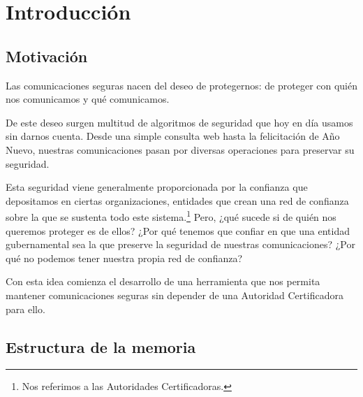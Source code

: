 
\chapter{Introducción} %

\label{Chapter1}


\newcommand{\keyword}[1]{\textbf{#1}}
\newcommand{\tabhead}[1]{\textbf{#1}}
\newcommand{\code}[1]{\texttt{#1}}
\newcommand{\file}[1]{\texttt{\bfseries#1}}
\newcommand{\option}[1]{\texttt{\itshape#1}}
\newcommand{\Mod}[1]{\ (\mathrm{mod}\ #1)}


\section{Motivación}

Las comunicaciones seguras nacen del deseo de protegernos: de proteger con quién nos comunicamos y qué comunicamos.

De este deseo surgen multitud de algoritmos de seguridad que hoy en día usamos sin darnos cuenta. Desde una simple consulta web hasta la felicitación de Año Nuevo, nuestras comunicaciones pasan por diversas operaciones para preservar su seguridad.

Esta seguridad viene generalmente proporcionada por la confianza que depositamos en ciertas organizaciones, entidades que crean una red de confianza sobre la que se sustenta todo este sistema.\footnote{Nos referimos a las Autoridades Certificadoras.} Pero, ¿qué sucede si de quién nos queremos proteger es de ellos? ¿Por qué tenemos que confiar en que una entidad gubernamental sea la que preserve la seguridad de nuestras comunicaciones? ¿Por qué no podemos tener nuestra propia red de confianza?

Con esta idea comienza el desarrollo de una herramienta que nos permita mantener comunicaciones seguras sin depender de una Autoridad Certificadora para ello.


\section{Estructura de la memoria}

